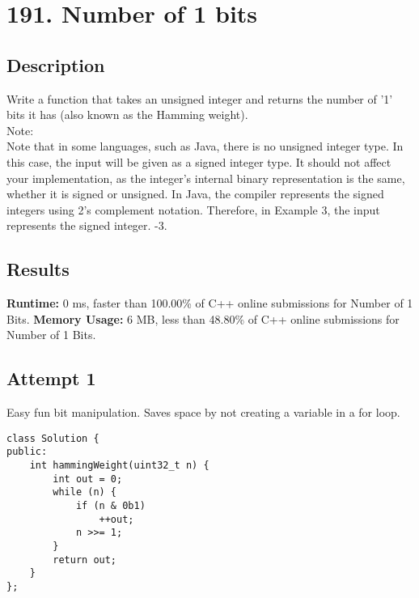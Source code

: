 \chapter{191. Number of 1 bits}
\section{Description}
Write a function that takes an unsigned integer and returns the number of '1' bits it has (also known as the Hamming weight).
\\
Note:
\\
   Note that in some languages, such as Java, there is no unsigned integer type. In this case, the input will be given as a signed integer type. It should not affect your implementation, as the integer's internal binary representation is the same, whether it is signed or unsigned.
    In Java, the compiler represents the signed integers using 2's complement notation. Therefore, in Example 3, the input represents the signed integer. -3.
\section{Results}
\textbf{Runtime:}
0 ms, faster than 100.00\% of C++ online submissions for Number of 1 Bits.
\textbf{Memory Usage:}
6 MB, less than 48.80\% of C++ online submissions for Number of 1 Bits.
\newpage
\section{Attempt 1}
Easy fun bit manipulation. Saves space by not creating a variable in a for loop.
\begin{lstlisting}
class Solution {
public:
    int hammingWeight(uint32_t n) {
        int out = 0;
        while (n) {
            if (n & 0b1)
                ++out;
            n >>= 1;
        }
        return out;
    }
};
\end{lstlisting}

